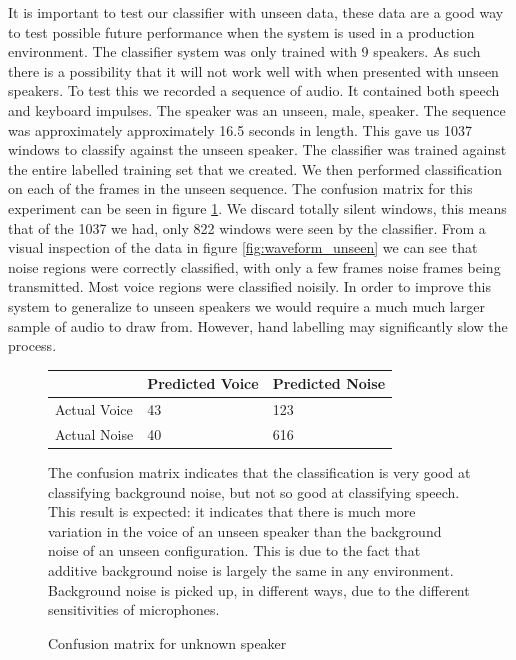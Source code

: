 \documentclass[ %
                    author={Sam Phippen},
                supervisor={Dr. Rafal Bogacz},
                     title={Real time voice activity detectors in noisy personal computing environments},
                  subtitle={},
                    degree={MEng},
                      year={2012} ]{thesis}
\begin{document}
It is important to test our classifier with unseen data, these data are a good
way to test possible future performance when the system is used in a production
environment. The classifier system was only trained with 9 speakers. As such
there is a possibility that it will not work well with when presented with
unseen speakers. To test this we recorded a sequence of audio. It contained
both speech and keyboard impulses. The speaker was an unseen, male, speaker.
The sequence was approximately approximately 16.5 seconds in length. This gave
us 1037 windows to classify against the unseen speaker. The classifier was
trained against the entire labelled training set that we created. We then
performed classification on each of the frames in the unseen sequence. The
confusion matrix for this experiment can be seen in figure
\ref{table:confusion_unseen}. We discard totally silent windows, this means
that of the 1037 we had, only 822 windows were seen by the classifier. From a
visual inspection of the data in figure \ref{fig:waveform_unseen} we can see
that noise regions were correctly classified, with only a few frames noise
frames being transmitted. Most voice regions were classified noisily. In order
to improve this system to generalize to unseen speakers we would require a much
much larger sample of audio to draw from. However, hand labelling may
significantly slow the process.


\begin{figure}
    \begin{center}
        \begin{tabular}{| l | l | l |}
            \hline
                         & Predicted Voice & Predicted Noise \\ \hline
            Actual Voice & 43              & 123 \\
            Actual Noise & 40              & 616 \\ \hline
        \end{tabular}
    \end{center}
    \vspace{\baselineskip}

    The confusion matrix indicates that the classification is very good at
    classifying background noise, but not so good at classifying speech. This
    result is expected: it indicates that there is much more variation in the
    voice of an unseen speaker than the background noise of an unseen
    configuration. This is due to the fact that additive background noise is
    largely the same in any environment. Background noise is picked up, in
    different ways, due to the different sensitivities of microphones.

    \caption{Confusion matrix for unknown speaker}
    \label{table:confusion_unseen}
\end{figure}
\end{document}
